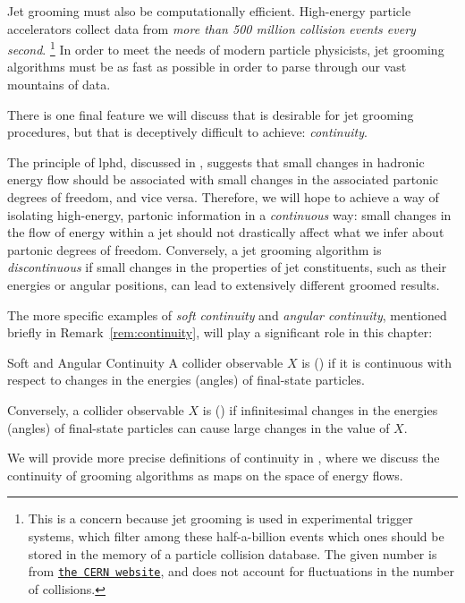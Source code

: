 Jet grooming must also be computationally efficient.
%
High-energy particle accelerators collect data from \textit{more than 500 million collision events every second}.%
\footnote{
    This is a concern because jet grooming is used in experimental trigger systems, which filter among these half-a-billion events which ones should be stored in the memory of a particle collision database.
    The given number is from \href{http://lhc-machine-outreach.web.cern.ch/collisions.htm}{\texttt{the CERN website}}, and does not account for fluctuations in the number of collisions.
}
%
In order to meet the needs of modern particle physicists, jet grooming algorithms must be as fast as possible in order to parse through our vast mountains of data.


There is one final feature we will discuss that is desirable for jet grooming procedures, but that is deceptively difficult to achieve:
%
\textit{continuity}.


The principle of \gls{lphd}, discussed in , suggests that small changes in hadronic energy flow should be associated with small changes in the associated partonic degrees of freedom, and vice versa.
%
Therefore, we will hope to achieve a way of isolating high-energy, partonic information in a \textit{continuous} way:
%
small changes in the flow of energy within a jet should not drastically affect what we infer about partonic degrees of freedom.
%
Conversely, a jet grooming algorithm is \textit{discontinuous} if small changes in the properties of jet constituents, such as their energies or angular positions, can lead to extensively different groomed results.

The more specific examples of \textit{soft continuity} and \textit{angular continuity}, mentioned briefly in Remark~\ref{rem:continuity}, will play a significant role in this chapter:
\begin{definitionbox}{Soft and Angular Continuity}{}
    A collider observable \(X\) is  () if it is continuous with respect to changes in the energies (angles) of final-state particles.

    Conversely, a collider observable \(X\) is  () if infinitesimal changes in the energies (angles) of final-state particles can cause large changes in the value of \(X\).
\end{definitionbox}
\noindent
We will provide more precise definitions of continuity in , where we discuss the continuity of grooming algorithms as maps on the space of energy flows.



